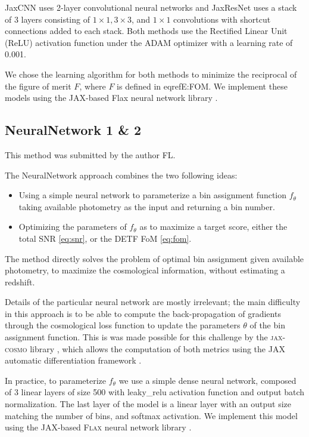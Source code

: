 \documentclass[twocolumn,twocolappendix]{aastex63}
\begin{document}
JaxCNN uses 2-layer convolutional neural networks and JaxResNet uses a stack of
3 layers consisting of $1 \times 1, 3 \times 3$, and $1 \times 1$ convolutions
with shortcut connections added to each stack. Both methods use the Rectified
Linear Unit (ReLU) activation function under the ADAM optimizer \cite{adam} with
a learning rate of 0.001. 
 
We chose the learning algorithm for both methods to minimize the reciprocal of
the figure of merit $F$, where $F$ is defined in eqref{E:FOM}. We implement
these models using the JAX-based Flax neural network library \cite{jax}. 


\subsection{ {\sc NeuralNetwork 1 \& 2} }
This method was submitted by the author FL.

The {\sc NeuralNetwork} approach combines the two following ideas:
\begin{itemize}
	\item Using a simple neural network to parameterize a bin assignment function $f_\theta$ taking available photometry as the input and returning a bin number. 
	\item Optimizing the parameters of $f_\theta$ as to maximize a target score, either the total SNR \autoref{eq:snr}, or the DETF FoM \autoref{eq:fom}.
\end{itemize}
The method directly solves the problem of optimal bin assignment given available photometry, to maximize the cosmological information, without estimating a redshift.


Details of the particular neural network are mostly irrelevant; the main difficulty in this approach is to be able to compute the back-propagation of gradients through the cosmological loss function to update the parameters $\theta$ of the bin assignment function. This is was made possible for this challenge by the \textsc{jax-cosmo} library \citep{jax-cosmo}, which allows the computation of both metrics using the JAX automatic differentiation framework \citep{jax}. 


In practice, to parameterize $f_\theta$ we use a simple dense neural network, composed of 3 linear layers of size 500 with leaky\_relu activation function and output batch normalization. The last layer of the model is a linear layer with an output size matching the number of bins, and softmax activation. We implement this model using the JAX-based \textsc{Flax} neural network library \citep{flax2020github}. 
\end{document}
